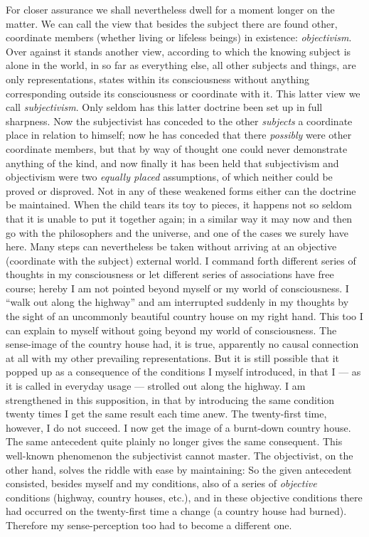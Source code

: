\documentclass[12pt,a4paper,openany]{book}
\newcommand{\opage}[1]{\marginnote{\footnotesize\textit{[#1]}}}
\begin{document}
For closer assurance we shall nevertheless dwell for a moment longer on the matter. We
can call the view that besides the subject there are found other, coordinate members
(whether living or lifeless beings) in existence: \emph{objectivism}. Over against it
stands another view, according to which the knowing subject is alone in the world, in so
far as everything else, all other subjects and things, are only representations, states
within its consciousness without anything corresponding outside its consciousness or
coordinate with it. This latter view we call \emph{subjectivism}. Only seldom has this
latter doctrine been set up in full sharpness. Now the subjectivist has conceded to the
other \emph{subjects} a coordinate place in relation to himself; now he has conceded that
there \emph{possibly} were other coordinate members, but that by way of thought one could
never demonstrate anything of the kind, and now finally it has been held that subjectivism
and objectivism were two \emph{equally placed} assumptions, of which neither could be
proved or disproved. Not in any of these weakened forms either can the doctrine be
maintained. When the child tears its toy to pieces, it happens not so seldom that it is
unable to put it together again; in a similar way it may now and then go with the
philosophers and the universe, and one of the cases we surely have here. Many steps can
nevertheless be taken without arriving at an objective (coordinate with the
subject) external world. I command forth different series of thoughts in my consciousness
or let different series of associations have free course; hereby I am not pointed beyond
myself or my world of consciousness. I ``walk out along the highway'' and am interrupted
\setcounter{footnote}{0}%
\opage{254}suddenly in my thoughts by the sight of an uncommonly beautiful country house on my
right hand. This too I can explain to myself without going beyond my world of
consciousness. The sense-image of the country house had, it is true, apparently no causal
connection at all with my other prevailing representations. But it is still possible that
it popped up as a consequence of the conditions I myself introduced, in that I --- as it
is called in everyday usage --- strolled out along the highway. I am strengthened in this
supposition, in that by introducing the same condition twenty times I get the same result
each time anew. The twenty-first time, however, I do not succeed. I now get the image of a
burnt-down country house. The same antecedent quite plainly no longer gives the same
consequent. This well-known phenomenon the subjectivist cannot master. The objectivist,
on the other hand, solves the riddle with ease by maintaining: So the given antecedent
consisted, besides myself and my conditions, also of a series of \emph{objective}
conditions (highway, country houses, etc.), and in these objective conditions there had
occurred on the twenty-first time a change (a country house had burned). Therefore my
sense-perception too had to become a different one.
\end{document}
